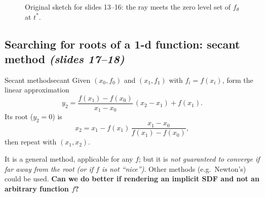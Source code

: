 \documentclass[11pt,a4paper]{article}
\newcommand{\bx}{{\bm{x}}}
\newcommand{\bp}{{\bm{p}}}
\newcommand{\bom}{{\bm{\omega}}}
\newcommand{\br}{{\bm{r}}}
\begin{document}
\begin{figure}[htbp]
\centering
{}
\caption{Original sketch for slides 13--16: the ray meets the zero level set of $f_\theta$ at $t^*$.}
\end{figure}

\subsection{Searching for roots of a 1-d function: secant method \emph{(slides 17--18)}}
\begin{Algorithm}{Secant method}{secant}
Given $(x_0,f_0)$ and $(x_1,f_1)$ with $f_i=f(x_i)$, form the linear approximation
\[
y_2=\frac{f(x_1)-f(x_0)}{x_1-x_0}\,(x_2-x_1)+f(x_1).
\]
Its root ($y_2=0$) is
\[
x_2=x_1-f(x_1)\,\frac{x_1-x_0}{f(x_1)-f(x_0)},
\]
then repeat with $(x_1,x_2)$.
\end{Algorithm}
It is a general method, applicable for any $f$; but it is \emph{not guaranteed to converge if far away from the root
(or if $f$ is not ``nice'')}. Other methods (e.g.\ Newton's) could be used. \textbf{Can we do better if rendering an
implicit SDF and not an arbitrary function $f$?}
\end{document}
